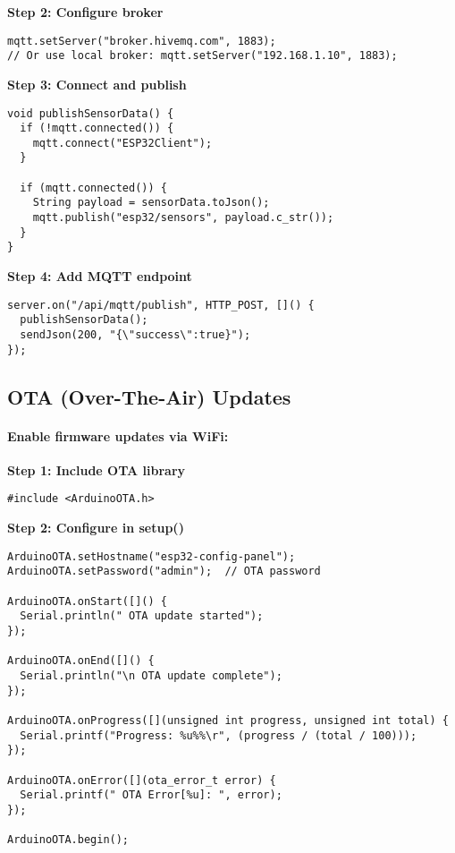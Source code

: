 \documentclass[11pt,a4paper]{article}
\begin{document}
\textbf{Step 2: Configure broker}
\begin{verbatim}
mqtt.setServer("broker.hivemq.com", 1883);
// Or use local broker: mqtt.setServer("192.168.1.10", 1883);
\end{verbatim}

\textbf{Step 3: Connect and publish}
\begin{verbatim}
void publishSensorData() {
  if (!mqtt.connected()) {
    mqtt.connect("ESP32Client");
  }
  
  if (mqtt.connected()) {
    String payload = sensorData.toJson();
    mqtt.publish("esp32/sensors", payload.c_str());
  }
}
\end{verbatim}

\textbf{Step 4: Add MQTT endpoint}
\begin{verbatim}
server.on("/api/mqtt/publish", HTTP_POST, []() {
  publishSensorData();
  sendJson(200, "{\"success\":true}");
});
\end{verbatim}

\subsection{OTA (Over-The-Air) Updates}

\paragraph{Enable firmware updates via WiFi:}

\textbf{Step 1: Include OTA library}
\begin{verbatim}
#include <ArduinoOTA.h>
\end{verbatim}

\textbf{Step 2: Configure in setup()}
\begin{verbatim}
ArduinoOTA.setHostname("esp32-config-panel");
ArduinoOTA.setPassword("admin");  // OTA password

ArduinoOTA.onStart([]() {
  Serial.println(" OTA update started");
});

ArduinoOTA.onEnd([]() {
  Serial.println("\n OTA update complete");
});

ArduinoOTA.onProgress([](unsigned int progress, unsigned int total) {
  Serial.printf("Progress: %u%%\r", (progress / (total / 100)));
});

ArduinoOTA.onError([](ota_error_t error) {
  Serial.printf(" OTA Error[%u]: ", error);
});

ArduinoOTA.begin();
\end{verbatim}
\end{document}
